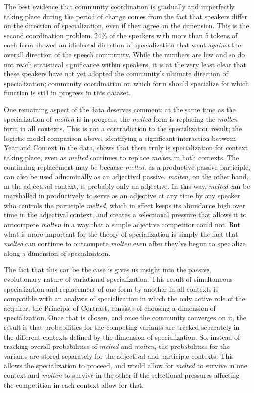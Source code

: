\documentclass{artikel3}
\begin{document}
The best evidence that community coordination is gradually and imperfectly taking place during the period of change comes from the fact that speakers differ on the direction of specialization, even if they agree on the dimension. This is the second coordination problem. 24\% of the speakers with more than 5 tokens of each form showed an idiolectal direction of specialization that went \textsl{against} the overall direction of the speech community. While the numbers are low and so do not reach statistical significance within speakers, it is at the very least clear that these speakers have not yet adopted the community's ultimate direction of specialization; community coordination on which form should specialize for which function is still in progress in this dataset.

One remaining aspect of the data deserves comment: at the same time as the specialization of \textsl{molten} is in progress, the \textsl{melted} form is replacing the \textsl{molten} form in all contexts. This is not a contradiction to the specialization result; the logistic model comparison above, identifying a significant interaction between Year and Context in the data, shows that there truly is specialization for context taking place, even as \textsl{melted} continues to replace \textsl{molten} in both contexts. The continuing replacement may be because \textsl{melted}, as a productive passive participle, can also be used adnominally as an adjectival passive. \textsl{molten}, on the other hand, in the adjectival context, is probably only an adjective. In this way, \textsl{melted} can be marshalled in productively to serve as an adjective at any time by any speaker who controls the participle \textsl{melted}, which in effect keeps its abundance high over time in the adjectival context, and creates a selectional pressure that allows it to outcompete \textsl{molten} in a way that a simple adjective competitor could not. But what is more important for the theory of specialization is simply the fact that \textsl{melted} can continue to outcompete \textsl{molten} even after they've begun to specialize along a dimension of specialization.

The fact that this can be the case is gives us insight into the passive, evolutionary nature of variational specialization. This result of simultaneous specialization and replacement of one form by another in all contexts is compatible with an analysis of specialization in which the only active role of the acquirer, the Principle of Contrast, consists of choosing a dimension of specialization. Once that is chosen, and once the community converges on it, the result is that probabilities for the competing variants are tracked separately in the different contexts defined by the dimension of specialization. So, instead of tracking overall probabilities of \textsl{melted} and \textsl{molten}, the probabilities for the variants are stored separately for the adjectival and participle contexts. This allows the specialization to proceed, and would allow for \textsl{melted} to survive in one context and \textsl{molten} to survive in the other if the selectional pressures affecting the competition in each context allow for that.
\end{document}

